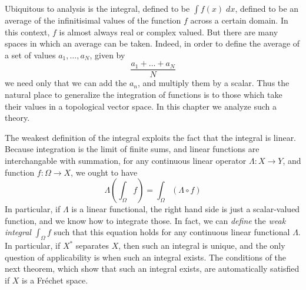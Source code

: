 Ubiquitous to analysis is the integral, defined to be $\int f(x)\; dx$, defined to be an average of the infinitisimal values of the function $f$ across a certain domain. In this context, $f$ is almost always real or complex valued. But there are many spaces in which an average can be taken. Indeed, in order to define the average of a set of values $a_1, \dots, a_N$, given by
%
\[ \frac{a_1 + \dots + a_N}{N} \]
%
we need only that we can add the $a_n$, and multiply them by a scalar. Thus the natural place to generalize the integration of functions is to those which take their values in a topological vector space. In this chapter we analyze such a theory.

The weakest definition of the integral exploits the fact that the integral is linear. Because integration is the limit of finite sums, and linear functions are interchangable with summation, for any continuous linear operator $\Lambda: X \to Y$, and function $f: \Omega \to X$, we ought to have
%
\[ \Lambda \left( \int_\Omega f \right) = \int_\Omega (\Lambda \circ f) \]
%
In particular, if $\Lambda$ is a linear functional, the right hand side is just a scalar-valued function, and we know how to integrate those. In fact, we can {\it define} the \emph{weak integral} $\int_\Omega f$ such that this equation holds for any continuous linear functional $\Lambda$. In particular, if $X^*$ separates $X$, then such an integral is unique, and the only question of applicability is when such an integral exists. The conditions of the next theorem, which show that such an integral exists, are automatically satisfied if $X$ is a Fr\'{e}chet space.

